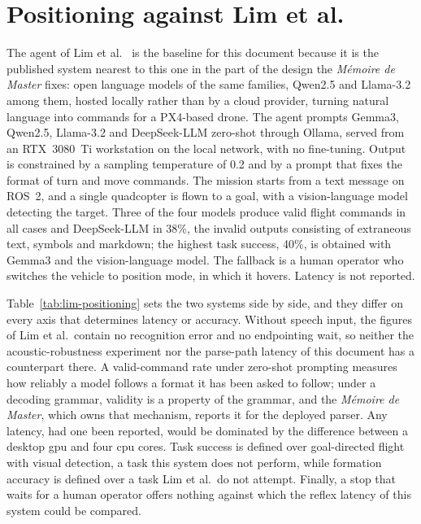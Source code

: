 \section{Positioning against Lim et al.}
\label{sec:lim-positioning}
The agent of Lim et al.~\cite{lim2025} is the baseline for this document because it is the published
system nearest to this one in the part of the design the \emph{M\'emoire de Master} fixes: open
language models of the same families, Qwen2.5 and Llama-3.2 among them, hosted locally rather than by
a cloud provider, turning natural language into commands for a PX4-based drone. The agent prompts
Gemma3, Qwen2.5, Llama-3.2 and DeepSeek-LLM zero-shot through Ollama, served from an RTX~3080~Ti
workstation on the local network, with no fine-tuning. Output is constrained by a sampling
temperature of 0.2 and by a prompt that fixes the format of turn and move commands. The mission
starts from a text message on ROS~2, and a single quadcopter is flown to a goal, with a
vision-language model detecting the target. Three of the four models produce valid flight commands
in all cases and DeepSeek-LLM in 38\%, the invalid outputs consisting of extraneous text, symbols
and markdown; the highest task success, 40\%, is obtained with Gemma3 and the vision-language model.
The fallback is a human operator who switches the vehicle to position mode, in which it hovers.
Latency is not reported.

Table~\ref{tab:lim-positioning} sets the two systems side by side, and they differ on every axis
that determines latency or accuracy. Without speech input, the figures of Lim et al.\ contain no
recognition error and no endpointing wait, so neither the acoustic-robustness experiment nor the
parse-path latency of this document has a counterpart there. A valid-command rate under zero-shot
prompting measures how reliably a model follows a format it has been asked to follow; under a
decoding grammar, validity is a property of the grammar, and the \emph{M\'emoire de Master}, which
owns that mechanism, reports it for the deployed parser. Any latency, had one been reported, would
be dominated by the difference between a desktop \gls{gpu} and four \gls{cpu} cores. Task success is
defined over goal-directed flight with visual detection, a task this system does not perform, while
formation accuracy is defined over a task Lim et al.\ do not attempt. Finally, a stop that waits for
a human operator offers nothing against which the reflex latency of this system could be compared.

